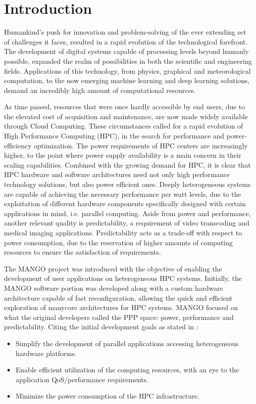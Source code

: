 \chapter{Introduction}

Humankind's push for innovation and problem-solving of the ever extending set of challenges it faces, resulted in a rapid evolution of the technological forefront. 
The development of digital systems capable of processing levels beyond humanly possible, expanded the realm of possibilities in both the scientific and engineering fields.
Applications of this technology, from physics, graphical and meteorological computation, to the now emerging machine learning and deep learning solutions, demand an incredibly high amount of computational resources.

As time passed, resources that were once hardly accessible by end users, due to the elevated cost of acquisition and maintenance, are now made widely available through Cloud Computing.
These circumstances called for a rapid evolution of High Performance Computing (HPC), in the search for performance and power-efficiency optimization. 
The power requirements of HPC centers are increasingly higher, to the point where power supply availability is a main concern in their scaling capabilities. Combined with the growing demand for HPC, it is clear that HPC hardware and software architectures need not only high performance technology solutions, but also power efficient ones.
Deeply heterogeneous systems are capable of achieving the necessary performance per watt levels, due to the exploitation of different hardware components specifically designed with certain applications in mind, i.e. parallel computing.
Aside from power and performance, another relevant quality is predictability, a requirement of video transcoding and medical imaging applications. Predictability acts as a trade-off with respect to power consumption, due to the reservation of higher amounts of computing resources to ensure the satisfaction of requirements. 

The MANGO project was introduced with the objective of enabling the development of user applications on heterogeneous HPC systems.
Initially, the MANGO software portion was developed along with a custom hardware architecture capable of fast reconfiguration, allowing the quick and efficient exploration of manycore architectures for HPC systems.
MANGO focused on what the original developers called the PPP space: power, performance and predictability. 
Citing the initial development goals as stated in \cite{mango_exploring_manycore_architectures}:
\begin{itemize}
    \item Simplify the development of parallel applications accessing heterogeneous hardware platforms.
    \item Enable efficient utilization of the computing resources, with an eye to the application QoS/performance requirements.
    \item Minimize the power consumption of the HPC infrastructure.
\end{itemize}

